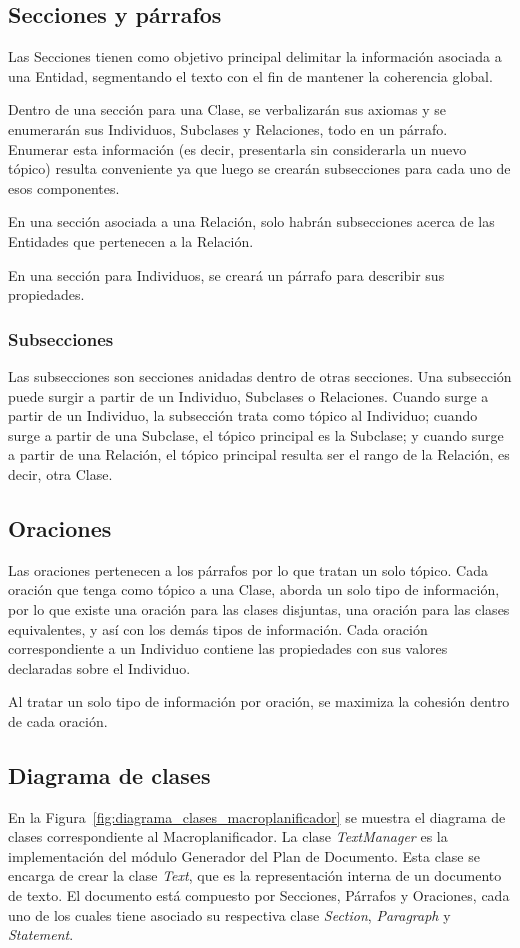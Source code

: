 \subsection{Secciones y párrafos}
Las Secciones tienen como objetivo principal delimitar la información asociada a una Entidad, segmentando el texto con el fin de mantener la coherencia global.

Dentro de una sección para una Clase, se verbalizarán sus axiomas y se enumerarán sus Individuos, Subclases y Relaciones, todo en un párrafo. Enumerar esta información (es decir, presentarla sin considerarla un nuevo tópico) resulta conveniente ya que luego se crearán subsecciones para cada uno de esos componentes.

En una sección asociada a una Relación, solo habrán subsecciones acerca de las Entidades que pertenecen a la Relación.

En una sección para Individuos, se creará un párrafo para describir sus propiedades.

\subsubsection{Subsecciones}
Las subsecciones son secciones anidadas dentro de otras secciones. Una subsección puede surgir a partir de un Individuo, Subclases o Relaciones. Cuando surge a partir de un Individuo, la subsección trata como tópico al Individuo; cuando surge a partir de una Subclase, el tópico principal es la Subclase; y cuando surge a partir de una Relación, el tópico principal resulta ser el rango de la Relación, es decir, otra Clase.

\subsection{Oraciones}
Las oraciones pertenecen a los párrafos por lo que tratan un solo tópico. Cada oración que tenga como tópico a una Clase,  aborda un solo tipo de información, por lo que existe una oración para las clases disjuntas, una oración para las clases equivalentes, y así con los demás tipos de información. Cada oración correspondiente a un Individuo contiene las propiedades con sus valores declaradas sobre el Individuo.

Al tratar un solo tipo de información por oración, se maximiza la cohesión dentro de cada oración.


\subsection{Diagrama de clases}
En la Figura~\ref{fig:diagrama_clases_macroplanificador} se muestra el diagrama de clases correspondiente al Macroplanificador. La clase \emph{TextManager} es la implementación del módulo Generador del Plan de Documento. Esta clase se encarga de crear la clase \emph{Text}, que es la representación interna de un documento de texto. El documento está compuesto por Secciones, Párrafos y Oraciones, cada uno de los cuales tiene asociado su respectiva clase \emph{Section}, \emph{Paragraph} y \emph{Statement}.

